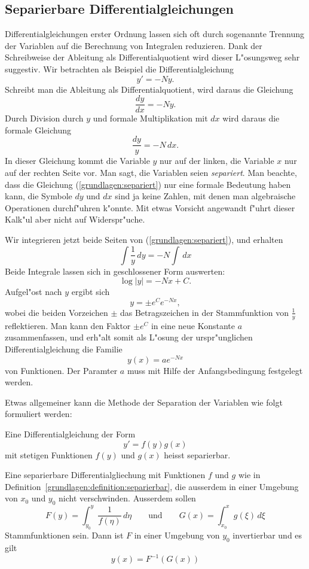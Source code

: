 \subsection{Separierbare Differentialgleichungen}
Differentialgleichungen erster Ordnung lassen sich oft durch sogenannte
Trennung der Variablen auf die Berechnung von Integralen reduzieren.
Dank der Schreibweise der Ableitung als Differentialquotient wird
dieser L"osungsweg sehr suggestiv.
Wir betrachten als Beispiel die Differentialgleichung
\[
y'=-Ny.
\]
Schreibt man die Ableitung als Differentialquotient, wird daraus die
Gleichung
\[
\frac{dy}{dx}=-Ny.
\]
Durch Division durch $y$ und formale Multiplikation mit $dx$ wird daraus
die formale Gleichung
\begin{equation}
\frac{dy}{y}=-N\,dx.
\label{grundlagen:separiert}
\end{equation}
In dieser Gleichung kommt die Variable $y$ nur auf der linken, die Variable
$x$ nur auf der rechten Seite vor.
Man sagt, die Variablen seien {\em separiert}.
Man beachte, dass die Gleichung (\ref{grundlagen:separiert}) nur eine
formale Bedeutung haben kann, die Symbole $dy$ und $dx$ sind ja keine Zahlen,
mit denen man algebraische Operationen durchf"uhren k"onnte.
Mit etwas Vorsicht angewandt f"uhrt dieser Kalk"ul aber nicht auf
Widerspr"uche.

Wir integrieren jetzt beide Seiten von (\ref{grundlagen:separiert}), und
erhalten 
\[
\int\frac1y\,dy=-N\int\,dx
\]
Beide Integrale lassen sich in geschlossener Form auswerten:
\[
\log|y|=-Nx+C.
\]
Aufgel"ost nach $y$ ergibt sich
\[
y=\pm e^{C}e^{-Nx},
\]
wobei die beiden Vorzeichen $\pm$ das Betragszeichen in der Stammfunktion
von $\frac1y$ reflektieren.
Man kann den Faktor $\pm e^{C}$ in eine neue Konstante $a$ zusammenfassen,
und erh"alt somit als L"osung der urspr"unglichen Differentialgleichung
die Familie
\[
y(x)=ae^{-Nx}
\]
von Funktionen.
Der Paramter $a$ muss mit Hilfe der Anfangsbedingung festgelegt werden.

Etwas allgemeiner kann die Methode der Separation der Variablen wie folgt
formuliert werden:
\begin{definition}
\label{grundlagen:definition:separierbar}
Eine Differentialgleichung der Form
\[
y'=f(y) g(x)
\]
mit stetigen Funktionen $f(y)$ und $g(x)$ heisst separierbar.
\end{definition}

\begin{satz}
Eine separierbare Differentialgliechung mit Funktionen $f$ und $g$ wie
in Definition~\ref{grundlagen:definition:separierbar},
die ausserdem in einer Umgebung von $x_0$ und $y_0$ nicht verschwinden.
Ausserdem sollen
\[
F(y)=\int_{y_0}^y \frac1{f(\eta)}\,d\eta
\qquad\text{und}\qquad
G(x)=\int_{x_0}^x g(\xi)\,d\xi
\]
Stammfunktionen sein.
Dann ist $F$ in einer Umgebung von $y_0$ invertierbar und es gilt
\[
y(x)=F^{-1}(G(x))
\]
\end{satz}

